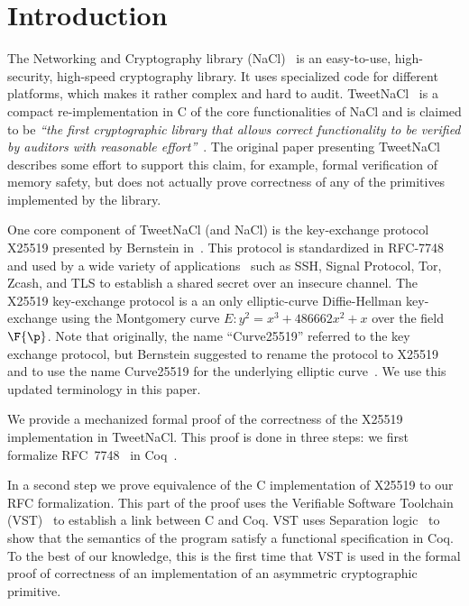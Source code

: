 \section{Introduction}
\label{sec:intro}

The Networking and Cryptography library (NaCl)~\cite{BLS12}
is an easy-to-use, high-security, high-speed cryptography library.
It uses specialized code for different platforms, which makes it rather complex and hard to audit.
TweetNaCl~\cite{BGJ+15} is a compact re-implementation in C
of the core functionalities of NaCl and is claimed to be
\emph{``the first cryptographic library that allows correct functionality
to be verified by auditors with reasonable effort''}~\cite{BGJ+15}.
The original paper presenting TweetNaCl describes some effort to support
this claim, for example, formal verification of memory safety, but does not actually
prove correctness of any of the primitives implemented by the library.

One core component of TweetNaCl (and NaCl) is the key-exchange protocol X25519 presented 
by Bernstein in~\cite{rfc7748}.
This protocol is standardized in RFC-7748 and used by a wide variety of applications~\cite{things-that-use-curve25519}
such as SSH, Signal Protocol, Tor, Zcash, and TLS to establish a shared secret over
an insecure channel.
The X25519 key-exchange protocol is a an \xcoord only
elliptic-curve Diffie-Hellman key-exchange using the Montgomery
curve $E: y^2 = x^3 + 486662 x^2 + x$ over the field $\F{\p}$.
Note that originally, the name ``Curve25519'' referred to the key exchange protocol,
but Bernstein suggested to rename the protocol to X25519 and to use the name
Curve25519 for the underlying elliptic curve~\cite{Ber14}.
We use this updated terminology in this paper.

We provide a mechanized formal proof of the correctness of the X25519
implementation in TweetNaCl.
This proof is done in three steps:
we first formalize RFC~7748~\cite{rfc7748} in Coq~\cite{coq-faq}.

In a second step we prove equivalence of the C implementation of X25519
to our RFC formalization.
This part of the proof uses the Verifiable Software Toolchain (VST)~\cite{2012-Appel}
to establish a link between C and Coq.
VST uses Separation logic~\cite{1969-Hoare,Reynolds02separationlogic}
to show that the semantics of the program satisfy a functional specification in Coq.
To the best of our knowledge, this is the first time that
VST is used in the formal proof of correctness of an implementation
of an asymmetric cryptographic primitive.

